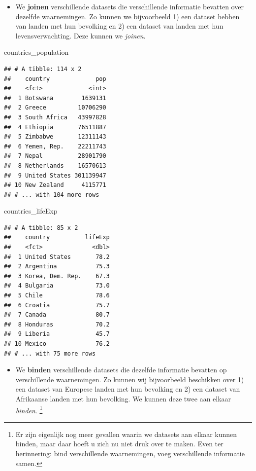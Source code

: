 \documentclass[]{tufte-book}
\newenvironment{Shaded}{}{}
\newcommand{\NormalTok}[1]{#1}
\providecommand{\tightlist}{%
  \setlength{\itemsep}{0pt}\setlength{\parskip}{0pt}}
\begin{document}
\begin{itemize}
\tightlist
\item
  We \textbf{joinen} verschillende datasets die verschillende informatie bevatten over dezelfde waarnemingen. Zo kunnen we bijvoorbeeld 1) een dataset hebben van landen met hun bevolking en 2) een dataset van landen met hun levensverwachting. Deze kunnen we \emph{joinen}.
\end{itemize}

\begin{Shaded}
\begin{Highlighting}[]
\NormalTok{countries_population}
\end{Highlighting}
\end{Shaded}

\begin{verbatim}
## # A tibble: 114 x 2
##    country             pop
##    <fct>             <int>
##  1 Botswana        1639131
##  2 Greece         10706290
##  3 South Africa   43997828
##  4 Ethiopia       76511887
##  5 Zimbabwe       12311143
##  6 Yemen, Rep.    22211743
##  7 Nepal          28901790
##  8 Netherlands    16570613
##  9 United States 301139947
## 10 New Zealand     4115771
## # ... with 104 more rows
\end{verbatim}

\begin{Shaded}
\begin{Highlighting}[]
\NormalTok{countries_lifeExp}
\end{Highlighting}
\end{Shaded}

\begin{verbatim}
## # A tibble: 85 x 2
##    country          lifeExp
##    <fct>              <dbl>
##  1 United States       78.2
##  2 Argentina           75.3
##  3 Korea, Dem. Rep.    67.3
##  4 Bulgaria            73.0
##  5 Chile               78.6
##  6 Croatia             75.7
##  7 Canada              80.7
##  8 Honduras            70.2
##  9 Liberia             45.7
## 10 Mexico              76.2
## # ... with 75 more rows
\end{verbatim}

\begin{itemize}
\tightlist
\item
  We \textbf{binden} verschillende datasets die dezelfde informatie bevatten op verschillende waarnemingen. Zo kunnen wij bijvoorbeeld beschikken over 1) een dataset van Europese landen met hun bevolking en 2) een dataset van Afrikaanse landen met hun bevolking. We kunnen deze twee aan elkaar \emph{binden}. \footnote{Er zijn eigenlijk nog meer gevallen waarin we datasets aan elkaar kunnen binden, maar daar hoeft u zich nu niet druk over te maken. Even ter herinnering: bind verschillende waarnemingen, voeg verschillende informatie samen.}
\end{itemize}
\end{document}
